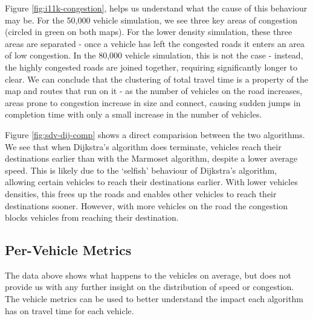 \documentclass[ %
                    author={Alexander Hill},
                supervisor={Dr. Benjamin Sach},
                    degree={MEng},
                     title={MARMOSET},
                  subtitle={Multi-Agent Route Management using Online Simulation for Efficient Transportation},
                      type={research},
                      year={2016} ]{dissertation}
\begin{document}
Figure \ref{fig:i11k-congestion}, helps us understand what the cause of this
behaviour may be. For the 50,000 vehicle simulation, we see three key areas of
congestion (circled in green on both maps). For the lower density simulation,
these three areas are separated - once a vehicle has left the congested roads it
enters an area of low congestion. In the 80,000 vehicle simulation, this is not
the case - instead, the highly congested roads are joined together, requiring
significantly longer to clear.  We can conclude that the clustering of total
travel time is a property of the map and routes that run on it - as the number
of vehicles on the road increases, areas prone to congestion increase in size
and connect, causing sudden jumps in completion time with only a small increase
in the number of vehicles.

Figure \ref{fig:sdv-dij-comp} shows a direct comparision between the two
algorithms. We see that when Dijkstra's algorithm does terminate, vehicles reach
their destinations earlier than with the Marmoset algorithm, despite a lower
average speed. This is likely due to the `selfish' behaviour of Dijkstra's
algorithm, allowing certain vehicles to reach their destinations earlier. With
lower vehicles densities, this frees up the roads and enables other vehicles to
reach their destinations sooner. However, with more vehicles on the road the
congestion blocks vehicles from reaching their destination.

\subsection{Per-Vehicle Metrics}

The data above shows what happens to the vehicles on average, but does not
provide us with any further insight on the distribution of speed or congestion.
The vehicle metrics can be used to better understand the impact each algorithm
has on travel time for each vehicle.
\end{document}
